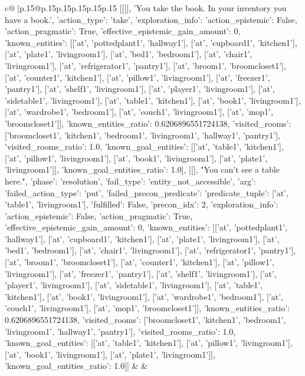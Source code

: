\documentclass{article}
\begin{document}
{\begin{supertabular}{c@{$\;$}|p{.15\linewidth}@{}p{.15\linewidth}p{.15\linewidth}p{.15\linewidth}p{.15\linewidth}p{.15\linewidth}}
{{{	 [[[], 'You take the book. In your inventory you have a book.', {'action_type': 'take', 'exploration_info': {'action_epistemic': False, 'action_pragmatic': True, 'effective_epistemic_gain_amount': 0, 'known_entities': [['at', 'pottedplant1', 'hallway1'], ['at', 'cupboard1', 'kitchen1'], ['at', 'plate1', 'livingroom1'], ['at', 'bed1', 'bedroom1'], ['at', 'chair1', 'livingroom1'], ['at', 'refrigerator1', 'pantry1'], ['at', 'broom1', 'broomcloset1'], ['at', 'counter1', 'kitchen1'], ['at', 'pillow1', 'livingroom1'], ['at', 'freezer1', 'pantry1'], ['at', 'shelf1', 'livingroom1'], ['at', 'player1', 'livingroom1'], ['at', 'sidetable1', 'livingroom1'], ['at', 'table1', 'kitchen1'], ['at', 'book1', 'livingroom1'], ['at', 'wardrobe1', 'bedroom1'], ['at', 'couch1', 'livingroom1'], ['at', 'mop1', 'broomcloset1']], 'known_entities_ratio': 0.6206896551724138, 'visited_rooms': ['broomcloset1', 'kitchen1', 'bedroom1', 'livingroom1', 'hallway1', 'pantry1'], 'visited_rooms_ratio': 1.0, 'known_goal_entities': [['at', 'table1', 'kitchen1'], ['at', 'pillow1', 'livingroom1'], ['at', 'book1', 'livingroom1'], ['at', 'plate1', 'livingroom1']], 'known_goal_entities_ratio': 1.0}}], [[], "You can't see a table here.", {'phase': 'resolution', 'fail_type': 'entity_not_accessible', 'arg': {'failed_action_type': 'put', 'failed_precon_predicate': {'predicate_tuple': ['at', 'table1', 'livingroom1'], 'fulfilled': False, 'precon_idx': 2}}, 'exploration_info': {'action_epistemic': False, 'action_pragmatic': True, 'effective_epistemic_gain_amount': 0, 'known_entities': [['at', 'pottedplant1', 'hallway1'], ['at', 'cupboard1', 'kitchen1'], ['at', 'plate1', 'livingroom1'], ['at', 'bed1', 'bedroom1'], ['at', 'chair1', 'livingroom1'], ['at', 'refrigerator1', 'pantry1'], ['at', 'broom1', 'broomcloset1'], ['at', 'counter1', 'kitchen1'], ['at', 'pillow1', 'livingroom1'], ['at', 'freezer1', 'pantry1'], ['at', 'shelf1', 'livingroom1'], ['at', 'player1', 'livingroom1'], ['at', 'sidetable1', 'livingroom1'], ['at', 'table1', 'kitchen1'], ['at', 'book1', 'livingroom1'], ['at', 'wardrobe1', 'bedroom1'], ['at', 'couch1', 'livingroom1'], ['at', 'mop1', 'broomcloset1']], 'known_entities_ratio': 0.6206896551724138, 'visited_rooms': ['broomcloset1', 'kitchen1', 'bedroom1', 'livingroom1', 'hallway1', 'pantry1'], 'visited_rooms_ratio': 1.0, 'known_goal_entities': [['at', 'table1', 'kitchen1'], ['at', 'pillow1', 'livingroom1'], ['at', 'book1', 'livingroom1'], ['at', 'plate1', 'livingroom1']], 'known_goal_entities_ratio': 1.0}}]] 
	  } 
	   } 
	   } 
	 & & \\ 
 


\end{supertabular}}
\end{document}
